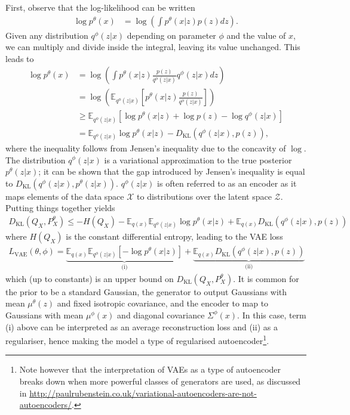 First, observe that the log-likelihood can be written 
%
\begin{align*}
\log p^\theta(x) &= \log \left( \int p^\theta(x|z) p(z) dz \right).
\end{align*}
%
Given any distribution $q^\phi(z|x)$ depending on parameter $\phi$ and the value of $x$, we can multiply and divide inside the integral, leaving its value unchanged.
This leads to
%
\begin{align*}
\log p^\theta(x) &= \log \left( \int p^\theta(x|z) \frac{p(z)}{q^\phi(z|x)} q^\phi(z|x) dz \right) \\
&= \log \left( \mathbb{E}_{q^\phi(z|x)} \left[  p^\theta(x|z) \frac{p(z)}{q^\phi(z|x)} \right]\right) \\
&\geq \mathbb{E}_{q^\phi(z|x)} \left[ \log p^\theta(x|z) + \log p(z) - \log q^\phi(z|x) \right] \\
&= \mathbb{E}_{q^\phi(z|x)} \log p^\theta(x|z)  - D_{\text{KL}}\left(q^\phi(z|x), p(z)\right),
\end{align*}
%
where the inequality follows from Jensen's inequality due to the concavity of $\log$.
The distribution $q^\phi(z|x)$ is a variational approximation to the true posterior $p^\theta(z|x)$; it can be shown that the gap introduced by Jensen's inequality is equal to $D_{\text{KL}}\left(q^\phi(z|x), p^\theta(z|x)\right)$. 
$q^\phi(z|x)$ is often referred to as an encoder as it maps elements of the data space $\mathcal{X}$ to distributions over the latent space $\mathcal{Z}$.
Putting things together yields
%
\begin{align*}
D_{\text{KL}}(Q_X, P^\theta_X) \leq -H(Q_X)  - \mathbb{E}_{q(x)} \mathbb{E}_{q^\phi(z|x)} \log p^\theta(x|z) + \mathbb{E}_{q(x)}D_{\text{KL}}\left(q^\phi(z|x), p(z)\right)
\end{align*}
%
where $H(Q_X)$ is the constant differential entropy, leading to the VAE loss
%
\begin{align}
L_{\text{VAE}}(\theta, \phi) =  \underbrace{\mathbb{E}_{q(x)} \mathbb{E}_{q^\phi(z|x)} \left[ - \log p^\theta(x|z)\right]}_{\text{(i)}} + \underbrace{\mathbb{E}_{q(x)}D_{\text{KL}}\left(q^\phi(z|x), p(z)\right)}_{\text{(ii)}}
\end{align}
%
which (up to constants) is an upper bound on $D_{\text{KL}}(Q_X, P^\theta_X)$.
It is common for the prior to be a standard Gaussian, the generator to output Gaussians with mean $\mu^\theta(z)$ and fixed isotropic covariance, and the encoder to map to Gaussians with mean $\mu^\phi(x)$ and diagonal covariance $\Sigma^\phi(x)$.
In this case, term (i) above can be interpreted as an average reconstruction loss and (ii) as a regulariser, hence making the model a type of regularised autoencoder\footnote{Note however that the interpretation of VAEs as a type of autoencoder breaks down when more powerful classes of generators are used, as discussed in \href{http://paulrubenstein.co.uk/variational-autoencoders-are-not-autoencoders/}{http://paulrubenstein.co.uk/variational-autoencoders-are-not-autoencoders/}.}.

